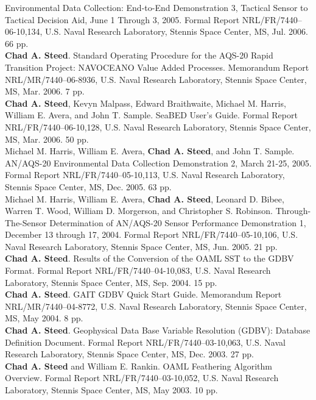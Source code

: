 \documentclass[11pt, letterpaper]{article}
\newcommand{\years}[1]{\marginnote{\scriptsize #1}}
\begin{document}
\begin{sloppypar}
Environmental Data Collection: End-to-End Demonstration 3, Tactical Sensor to
Tactical Decision Aid, June 1 Through 3, 2005. Formal Report
NRL/FR/7440–06-10,134, U.S. Naval Research Laboratory, Stennis Space Center,
MS, Jul. 2006. 66 pp.\\
\years{2006}\textbf{Chad A. Steed}. Standard Operating Procedure for the
AQS-20 Rapid Transition Project: NAVOCEANO Value Added Processes. Memorandum
Report NRL/MR/7440–06-8936, U.S. Naval Research Laboratory, Stennis Space
Center, MS, Mar. 2006. 7 pp.\\
\years{2006}\textbf{Chad A. Steed}, Kevyn Malpass, Edward Braithwaite,
Michael M. Harris, William E. Avera, and John T. Sample. SeaBED User’s Guide.
Formal Report NRL/FR/7440–06-10,128, U.S. Naval Research Laboratory, Stennis
Space Center, MS, Mar. 2006. 50 pp.\\
\years{2005}Michael M. Harris, William E. Avera, \textbf{Chad A. Steed}, and
John T. Sample. AN/AQS-20 Environmental Data Collection Demonstration 2,
March 21-25, 2005. Formal Report NRL/FR/7440–05-10,113, U.S. Naval Research
Laboratory, Stennis Space Center, MS, Dec. 2005. 63 pp.\\
\years{2005}Michael M. Harris, William E. Avera, \textbf{Chad A. Steed},
Leonard D. Bibee, Warren T. Wood, William D. Morgerson, and Christopher S.
Robinson. Through-The-Sensor Determination of AN/AQS-20 Sensor Performance
Demonstration 1, December 13 through 17, 2004. Formal Report
NRL/FR/7440–05-10,106, U.S. Naval Research Laboratory, Stennis Space
Center, MS, Jun. 2005. 21 pp.\\
\years{2004}\textbf{Chad A. Steed}. Results of the Conversion of the OAML SST
to the GDBV Format. Formal Report NRL/FR/7440–04-10,083, U.S. Naval Research
Laboratory, Stennis Space Center, MS, Sep. 2004. 15 pp.\\
\years{2004}\textbf{Chad A. Steed}. GAIT GDBV Quick Start Guide. Memorandum
Report NRL/MR/7440–04-8772, U.S. Naval Research Laboratory, Stennis Space
Center, MS, May 2004. 8 pp.\\
\years{2003}\textbf{Chad A. Steed}. Geophysical Data Base Variable Resolution
(GDBV): Database Definition Document. Formal Report NRL/FR/7440–03-10,063,
U.S. Naval Research Laboratory, Stennis Space Center, MS, Dec. 2003. 27 pp.\\
\years{2003}\textbf{Chad A. Steed} and William E. Rankin. OAML Feathering
Algorithm Overview. Formal Report NRL/FR/7440–03-10,052, U.S. Naval
Research Laboratory, Stennis Space Center, MS, May 2003. 10 pp.\\

\end{sloppypar}
\end{document}
